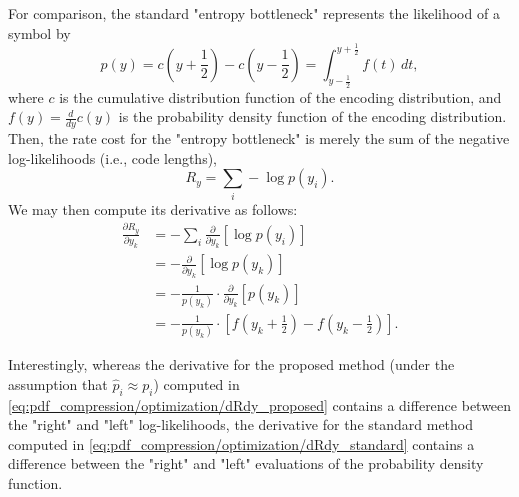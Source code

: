 
For comparison, the standard "entropy bottleneck" represents the likelihood of a symbol by
%
\begin{equation*}
  p(y)
  = c{\left(y + \frac{1}{2}\right)} - c{\left(y - \frac{1}{2}\right)}
  = \int_{y - \frac{1}{2}}^{y + \frac{1}{2}} f(t) \, dt,
\end{equation*}
%
where $c$ is the cumulative distribution function of the encoding distribution,
and $f(y) = \frac{d}{dy} c(y)$ is the probability density function of the encoding distribution.
Then, the rate cost for the "entropy bottleneck" is merely the sum of the negative log-likelihoods (i.e., code lengths),
%
\begin{equation*}
  R_y = \sum_i -\log p(y_i).
\end{equation*}
%
We may then compute its derivative as follows:
%
\begin{equation}
  \label{eq:pdf_compression/optimization/dRdy_standard}
  \begin{split}
    \frac{\partial R_y}{\partial y_k}
    &= - \sum_i \frac{\partial}{\partial y_k} \left[ \log p(y_i) \right] \\
    &= - \frac{\partial}{\partial y_k} \left[ \log p(y_k) \right] \\
    &= - \frac{1}{p(y_k)} \cdot \frac{\partial}{\partial y_k} \left[ p(y_k) \right] \\
    &= - \frac{1}{p(y_k)} \cdot \left[
      f{\left(y_k + \frac{1}{2}\right)} - f{\left(y_k - \frac{1}{2}\right)}
    \right].
  \end{split}
\end{equation}

Interestingly, whereas the derivative for the proposed method (under the assumption that $\hat{p}_i \approx p_i$) computed in \cref{eq:pdf_compression/optimization/dRdy_proposed} contains a difference between the "right" and "left" log-likelihoods,
the derivative for the standard method computed in \cref{eq:pdf_compression/optimization/dRdy_standard} contains a difference between the "right" and "left" evaluations of the probability density function.


